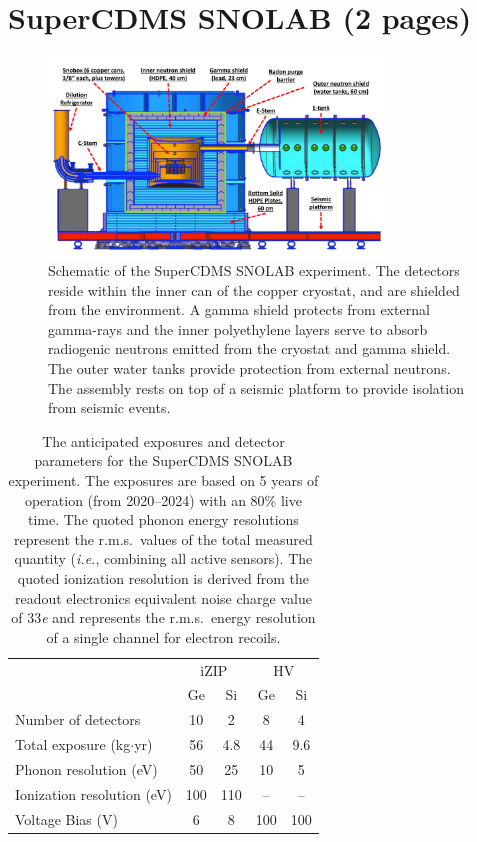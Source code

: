 \section{SuperCDMS SNOLAB (2 pages)}
\label{sec:snolab}

\begin{figure}
\centering
\includegraphics[width=0.8\textwidth]{Figures/f02_SuperCDMS_Schematic.pdf}
\caption{\footnotesize Schematic of the SuperCDMS SNOLAB experiment. The detectors reside within the inner can of the copper cryostat, and are shielded from the environment. A gamma shield protects from external gamma-rays and the inner polyethylene layers serve to absorb radiogenic neutrons emitted from the cryostat and gamma shield. The outer water tanks provide protection from external neutrons. The assembly rests on top of a seismic platform to provide isolation from seismic events. }
\label{fig:SCDMS_schematic}
\end{figure}

\begin{table}
\centering
\small
\begin{tabular}{  l  c  c  c  c } \hline
&\multicolumn{2}{c}{iZIP} & \multicolumn{2}{c}{HV}\\ 
&  Ge & Si    & Ge & Si \\ \hline
Number of detectors & 10 & 2 & 8 & 4\\
Total exposure (kg\(\cdot\)yr) & 56  & 4.8 & 44 & 9.6 \\
Phonon resolution (eV) & 50 & 25 & 10 & 5\\
Ionization resolution (eV) & 100 & 110 & -- & -- \\
Voltage Bias (V) & 6 & 8 & 100 & 100\\ \hline
\end{tabular}
\caption{The anticipated exposures and detector parameters for the SuperCDMS SNOLAB experiment. The exposures are based on 5 years of operation (from 2020--2024) with an 80\% live time. The quoted phonon energy resolutions represent the r.m.s.\ values of the total measured quantity (\textit{i.e.}, combining all active sensors). The quoted ionization resolution is derived from the readout electronics equivalent noise charge value of 33\textit{e} and represents the r.m.s.\ energy resolution of a single channel for electron recoils.}
\label{tab:ExpOperations}
\vspace{-20pt}
\end{table}


